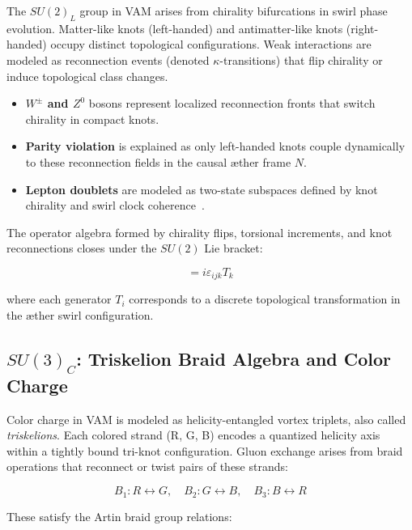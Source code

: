 \documentclass[12pt]{article}
\begin{document}
    The \( SU(2)_L \) group in VAM arises from chirality bifurcations in swirl phase evolution. Matter-like knots (left-handed) and antimatter-like knots (right-handed) occupy distinct topological configurations. Weak interactions are modeled as reconnection events (denoted \( \kappa \)-transitions) that flip chirality or induce topological class changes.

    \begin{itemize}
        \item \textbf{\( W^\pm \) and \( Z^0 \)} bosons represent localized reconnection fronts that switch chirality in compact knots.
        \item \textbf{Parity violation} is explained as only left-handed knots couple dynamically to these reconnection fields in the causal æther frame \( N \).
        \item \textbf{Lepton doublets} are modeled as two-state subspaces defined by knot chirality and swirl clock coherence~\cite{volovik2003universe}.
    \end{itemize}

    The operator algebra formed by chirality flips, torsional increments, and knot reconnections closes under the \( SU(2) \) Lie bracket:

    \begin{equation}
    [T_i, T_j] = i \varepsilon_{ijk} T_k
    \end{equation}

    where each generator \( T_i \) corresponds to a discrete topological transformation in the æther swirl configuration.

    \subsection{\textbf{\boldmath\texorpdfstring{$SU(3)_C$}{SU(3)C}}: Triskelion Braid Algebra and Color Charge}

    Color charge in VAM is modeled as helicity-entangled vortex triplets, also called \emph{triskelions}. Each colored strand (R, G, B) encodes a quantized helicity axis within a tightly bound tri-knot configuration. Gluon exchange arises from braid operations that reconnect or twist pairs of these strands:

    \begin{equation}
    B_1: R \leftrightarrow G, \quad B_2: G \leftrightarrow B, \quad B_3: B \leftrightarrow R
    \end{equation}

    These satisfy the Artin braid group relations:
\end{document}
